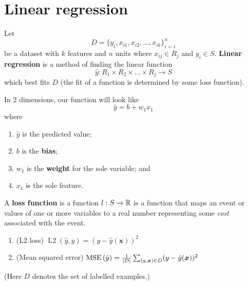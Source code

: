 \chapter{Linear regression}


\begin{definition}
    Let 
    \[
        D = \{y_i, x_{i1}, x_{i2}, \ldots, x_{ik}\}_{i=1}^n
    \]
    be a dataset with $k$ features and $n$ units
    where $x_{ij} \in R_j$ and $y_i \in S$.
    \textbf{Linear regression} is a method of finding the linear function
    \[
        \hat y: R_1 \times R_2 \times \ldots \times R_j \to S
    \]
    which best fits $D$
    (the fit of a function is determined by some loss function).
\end{definition}

\begin{example}
    In 2 dimensions, our function will look like
    \[ \hat y = b + w_1 x_1 \]
    where
    \begin{enumerate}
        \item $\hat y$ is the predicted value;
        \item $b$ is the \textbf{bias};
        \item $w_1$ is the \textbf{weight} for the sole variable; and
        \item $x_1$ is the sole feature.
    \end{enumerate}
\end{example}

\begin{definition}
    A \textbf{loss function} is a function $l: S \to \mathbb{R}$
    is a function that maps an event or values of one or more variables
    to a real number representing some \emph{cost} associated with the event.
\end{definition}

\begin{example}
    \hfill
    \begin{enumerate}
        \item (L2 loss)
            $\operatorname{L2}{(\hat y, y)} = (y - \hat y(\bm x))^2$

        \item (Mean squared error)
            $\operatorname{MSE}{(\hat y)} = \frac1{\left\lvert D\right\rvert} \sum_{(y, \bm x) \in D} (y - \hat y(\bm x))^2$
    \end{enumerate}
    (Here $D$ denotes the set of labelled examples.)
\end{example}

